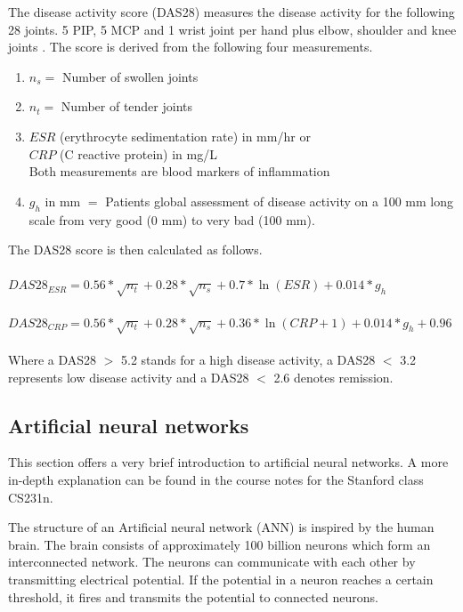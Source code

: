 \documentclass[12pt]{article}
\begin{document}
The disease activity score (DAS28) measures the disease activity for the following 28 joints. 5 PIP, 5 MCP and 1 wrist joint per hand plus elbow, shoulder and knee joints \cite{runmc}. The score is derived from the following four measurements.

\begin{enumerate}[label=(\alph*)]
\item $n_s =$ Number of swollen joints
\item $n_t =$ Number of tender joints
\item $ESR$ (erythrocyte sedimentation rate) in mm/hr or \\ $CRP$ (C reactive protein) in mg/L\\ Both measurements are blood markers of inflammation
\item $g_h$ in mm $=$ Patients global assessment of disease activity on a 100 mm long scale from very good (0 mm) to very bad (100 mm).
\end{enumerate}

\noindent The DAS28 score is then calculated as follows. \cite{runmc_formula}
\\
\\
$DAS28_{ESR} = 0.56 * \sqrt{n_t} + 0.28 * \sqrt{n_s} + 0.7 * \ln{(ESR)} + 0.014 * g_h$
\\
\\
$DAS28_{CRP} = 0.56 * \sqrt{n_t} + 0.28 * \sqrt{n_s} + 0.36 * \ln{(CRP + 1)} + 0.014 * g_h + 0.96$
\\
\\
\noindent Where a DAS28 $>$ 5.2 stands for a high disease activity, a DAS28 $<$ 3.2 represents low disease activity and a DAS28 $<$ 2.6 denotes remission.

\subsection{Artificial neural networks}
\label{subsec:ann}
This section offers a very brief introduction to artificial neural networks. A more in-depth explanation can be found in the course notes for the Stanford class CS231n. \cite{karpathy}

The structure of an Artificial neural network (ANN) is inspired by the human brain. The brain consists of approximately 100 billion neurons which form an interconnected network. The neurons can communicate with each other by transmitting electrical potential. If the potential in a neuron reaches a certain threshold, it fires and transmits the potential to connected neurons. \cite{kruse_2016}
\end{document}
